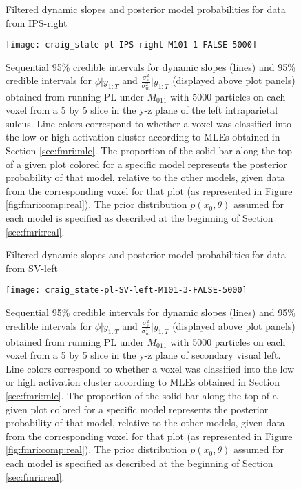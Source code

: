 
\begin{figure}
\ssp
\centering
\caption{Filtered dynamic slopes and posterior model probabilities for data from IPS-right} \label{fig:fmri:slopes:real:IPSr}
\texttt{[image: craig\_state-pl-IPS-right-M101-1-FALSE-5000]}
\caption*{Sequential 95\% credible intervals for dynamic slopes (lines) and 95\% credible intervals for $\phi|y_{1:T}$ and $\frac{\sigma^2_s}{\sigma^2_m}|y_{1:T}$ (displayed above plot panels) obtained from running PL under $M_{011}$ with 5000 particles on each voxel from a 5 by 5 slice in the y-z plane of the left intraparietal sulcus. Line colors correspond to whether a voxel was classified into the low or high activation cluster according to MLEs obtained in Section \ref{sec:fmri:mle}. The proportion of the solid bar along the top of a given plot colored for a specific model represents the posterior probability of that model, relative to the other models, given data from the corresponding voxel for that plot (as represented in Figure \ref{fig:fmri:comp:real}). The prior distribution $p(x_0,\theta)$ assumed for each model is specified as described at the beginning of Section \ref{sec:fmri:real}.}
\end{figure}

\begin{figure}
\ssp
\centering
\caption{Filtered dynamic slopes and posterior model probabilities for data from SV-left} \label{fig:fmri:slopes:real}
\texttt{[image: craig\_state-pl-SV-left-M101-3-FALSE-5000]}
\caption*{Sequential 95\% credible intervals for dynamic slopes (lines) and 95\% credible intervals for $\phi|y_{1:T}$ and $\frac{\sigma^2_s}{\sigma^2_m}|y_{1:T}$ (displayed above plot panels) obtained from running PL under $M_{011}$ with 5000 particles on each voxel from a 5 by 5 slice in the y-z plane of secondary visual left. Line colors correspond to whether a voxel was classified into the low or high activation cluster according to MLEs obtained in Section \ref{sec:fmri:mle}. The proportion of the solid bar along the top of a given plot colored for a specific model represents the posterior probability of that model, relative to the other models, given data from the corresponding voxel for that plot (as represented in Figure \ref{fig:fmri:comp:real}). The prior distribution $p(x_0,\theta)$ assumed for each model is specified as described at the beginning of Section \ref{sec:fmri:real}.}
\end{figure}

